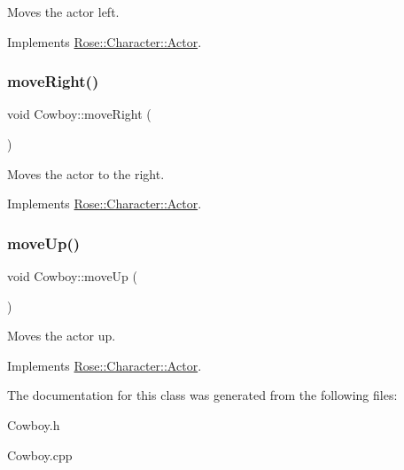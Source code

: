 Moves the actor left. 



Implements \mbox{\hyperlink{classRose_1_1Character_1_1Actor_a45191259db61cf46cb3d99bf186b48d3}{Rose\+::\+Character\+::\+Actor}}.

\mbox{\label{classCowboy_a2094d31b2535a25ef8a40945473cf884}} 
\subsubsection{\texorpdfstring{moveRight()}{moveRight()}}
{\footnotesize\ttfamily void Cowboy\+::move\+Right (\begin{DoxyParamCaption}{ }\end{DoxyParamCaption})\hspace{0.3cm}{\ttfamily [virtual]}}



Moves the actor to the right. 



Implements \mbox{\hyperlink{classRose_1_1Character_1_1Actor_a89ce0e5d1d6d25b1612867b982221dc9}{Rose\+::\+Character\+::\+Actor}}.

\mbox{\label{classCowboy_a3c4b0540c47492d02fa64b4740a35bcf}} 
\subsubsection{\texorpdfstring{moveUp()}{moveUp()}}
{\footnotesize\ttfamily void Cowboy\+::move\+Up (\begin{DoxyParamCaption}{ }\end{DoxyParamCaption})\hspace{0.3cm}{\ttfamily [virtual]}}



Moves the actor up. 



Implements \mbox{\hyperlink{classRose_1_1Character_1_1Actor_afd7130be2654a3fa94122cf532de4b79}{Rose\+::\+Character\+::\+Actor}}.



The documentation for this class was generated from the following files\+:\begin{DoxyCompactItemize}
\item 
Cowboy.\+h\item 
Cowboy.\+cpp\end{DoxyCompactItemize}
